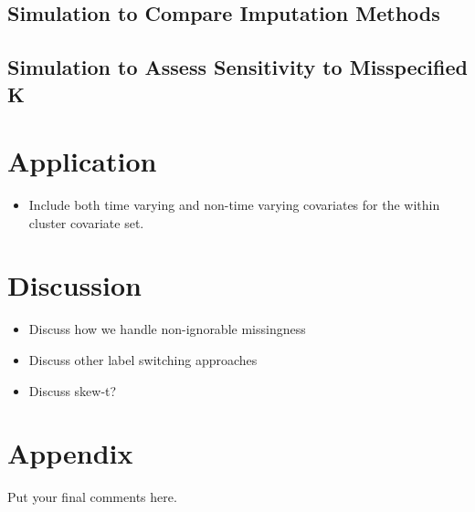 \documentclass[useAMS,referee]{biom}
\begin{document}
\subsection{Simulation to Compare Imputation Methods}

\subsection{Simulation to Assess Sensitivity to Misspecified K}

\newpage

\section{Application}
\label{s:app}

\begin{itemize}

\item Include both time varying and non-time varying covariates for the within cluster covariate set. 

\end{itemize}

\newpage

\section{Discussion}
\label{s:discuss}


\begin{itemize}

\item Discuss how we handle non-ignorable missingness 

\item Discuss other label switching approaches

\item Discuss skew-t?

\end{itemize}


\section{Appendix}

Put your final comments here. 

\end{document}
